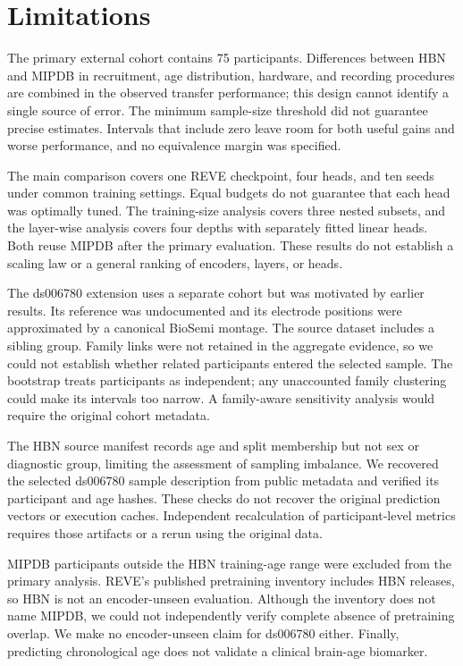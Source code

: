 \section{Limitations}

The primary external cohort contains 75 participants. Differences between HBN
and MIPDB in recruitment, age distribution, hardware, and recording procedures
are combined in the observed transfer performance; this design cannot identify
a single source of error. The minimum sample-size threshold did not guarantee
precise estimates. Intervals that include zero leave room for both useful gains
and worse performance, and no equivalence margin was specified.

The main comparison covers one REVE checkpoint, four heads, and ten seeds under
common training settings. Equal budgets do not guarantee that each head was
optimally tuned. The training-size analysis covers three nested subsets, and
the layer-wise analysis covers four depths with separately fitted linear heads.
Both reuse MIPDB after the primary evaluation. These results do not establish a
scaling law or a general ranking of encoders, layers, or heads.

The ds006780 extension uses a separate cohort but was motivated by earlier
results. Its reference was undocumented and its electrode positions were
approximated by a canonical BioSemi montage. The source dataset includes a
sibling group. Family links were not retained in the aggregate evidence, so we
could not establish whether related participants entered the selected sample.
The bootstrap treats participants as independent; any unaccounted family
clustering could make its intervals too narrow. A family-aware sensitivity
analysis would require the original cohort metadata.

The HBN source manifest records age and split membership but not sex or
diagnostic group, limiting the assessment of sampling imbalance. We recovered
the selected ds006780 sample description from public metadata and verified its
participant and age hashes. These checks do not recover the original prediction
vectors or execution caches. Independent recalculation of participant-level
metrics requires those artifacts or a rerun using the original data.

MIPDB participants outside the HBN training-age range were excluded from the
primary analysis. REVE's published pretraining inventory includes HBN releases,
so HBN is not an encoder-unseen evaluation. Although the inventory does not name
MIPDB, we could not independently verify complete absence of pretraining overlap.
We make no encoder-unseen claim for ds006780 either. Finally, predicting
chronological age does not validate a clinical brain-age biomarker.
